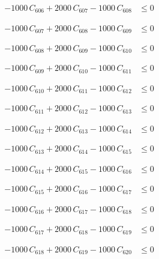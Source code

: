 \documentclass[a4paper,11pt]{article}
\begin{document}
\begin{align}
-1000\,C_{606} + 2000\,C_{607} - 1000\,C_{608} &\leq 0 \nonumber
\end{align}

\begin{align}
-1000\,C_{607} + 2000\,C_{608} - 1000\,C_{609} &\leq 0 \nonumber
\end{align}

\begin{align}
-1000\,C_{608} + 2000\,C_{609} - 1000\,C_{610} &\leq 0 \nonumber
\end{align}

\begin{align}
-1000\,C_{609} + 2000\,C_{610} - 1000\,C_{611} &\leq 0 \nonumber
\end{align}

\begin{align}
-1000\,C_{610} + 2000\,C_{611} - 1000\,C_{612} &\leq 0 \nonumber
\end{align}

\begin{align}
-1000\,C_{611} + 2000\,C_{612} - 1000\,C_{613} &\leq 0 \nonumber
\end{align}

\begin{align}
-1000\,C_{612} + 2000\,C_{613} - 1000\,C_{614} &\leq 0 \nonumber
\end{align}

\begin{align}
-1000\,C_{613} + 2000\,C_{614} - 1000\,C_{615} &\leq 0 \nonumber
\end{align}

\begin{align}
-1000\,C_{614} + 2000\,C_{615} - 1000\,C_{616} &\leq 0 \nonumber
\end{align}

\begin{align}
-1000\,C_{615} + 2000\,C_{616} - 1000\,C_{617} &\leq 0 \nonumber
\end{align}

\begin{align}
-1000\,C_{616} + 2000\,C_{617} - 1000\,C_{618} &\leq 0 \nonumber
\end{align}

\begin{align}
-1000\,C_{617} + 2000\,C_{618} - 1000\,C_{619} &\leq 0 \nonumber
\end{align}

\begin{align}
-1000\,C_{618} + 2000\,C_{619} - 1000\,C_{620} &\leq 0 \nonumber
\end{align}
\end{document}

